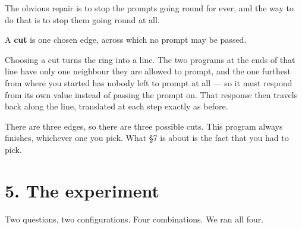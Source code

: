 \documentclass[11pt,a4paper]{article}
\begin{document}
The obvious repair is to stop the prompts going round for ever, and the way
to do that is to stop them going round at all.

\begin{keybox}
A \textbf{cut} is one chosen edge, across which no prompt may be passed.
\end{keybox}

Choosing a cut turns the ring into a line. The two programs at the ends of that
line have only one neighbour they are allowed to prompt, and the one furthest from
where you started has nobody left to prompt at all --- so it must respond from
its own value instead of passing the prompt on. That response then travels back
along the line, translated at each step exactly as before.

\begin{center}
\end{center}

There are three edges, so there are three possible cuts. This program always
finishes, whichever one you pick. What \S7 is about is the fact that you had to
pick.

\section*{5. The experiment}

Two questions, two configurations. Four combinations. We ran all four.
\end{document}
